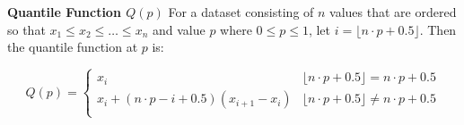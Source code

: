 \documentclass[10pt,landscape]{article}
\begin{document}
\begin{multicols}{2}
\textbf{Quantile Function $Q(p)$}
For a dataset consisting of $n$ values that are ordered so that $x_1 \le x_2 \le \ldots \le x_n$ and value $p$ where $0 \le p \le 1$, let $i = \lfloor n \cdot p + 0.5 \rfloor$. 
Then the quantile function at $p$ is:

\[
Q(p) = 
\begin{cases}
x_i & \lfloor n \cdot p + 0.5 \rfloor = n \cdot p + 0.5 \\
x_i + (n \cdot p - i + 0.5)(x_{i+1} - x_i) & \lfloor n \cdot p + 0.5 \rfloor \ne n \cdot p + 0.5 \\
\end{cases}
\]



\end{multicols}
\end{document}
